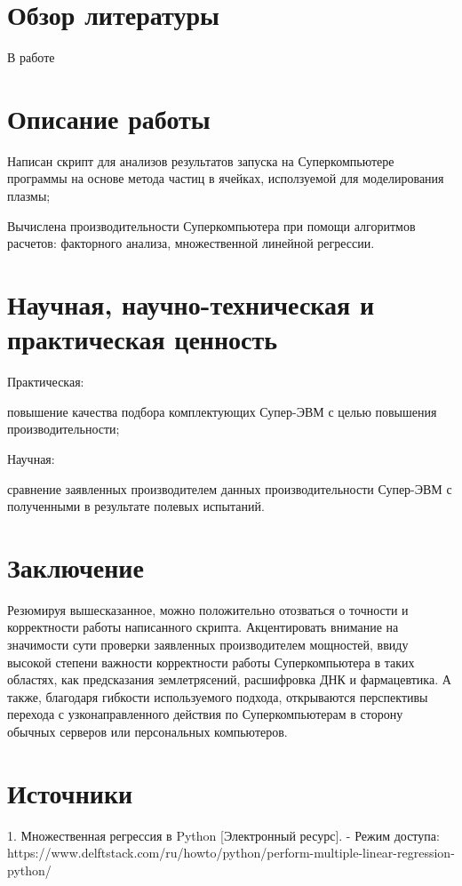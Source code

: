 \documentclass{article}
\begin{document}
\section{Обзор литературы}
В работе \cite{greenwade93}

\section{Описание работы}
Написан скрипт для анализов результатов запуска на Суперкомпьютере программы на основе метода частиц в ячейках, исползуемой для моделирования плазмы;

Вычислена производительности Суперкомпьютера при помощи алгоритмов расчетов: факторного анализа, множественной линейной регрессии.

\section{Научная, научно-техническая и практическая ценность}
Практическая:

повышение качества подбора комплектующих Супер-ЭВМ с целью повышения производительности;

Научная:

сравнение заявленных производителем данных производительности Супер-ЭВМ с полученными в результате полевых испытаний.

\section{Заключение}
Резюмируя вышесказанное, можно положительно отозваться о точности и корректности работы написанного скрипта. Акцентировать внимание на значимости сути проверки заявленных производителем мощностей, ввиду высокой степени важности корректности работы Суперкомпьютера в таких областях, как предсказания землетрясений, расшифровка ДНК и фармацевтика. А также, благодаря гибкости используемого подхода, открываются перспективы перехода с узконаправленного действия по Суперкомпьютерам в сторону обычных серверов или персональных компьютеров.




\section{Источники}
1. Множественная регрессия в Python [Электронный ресурс].
   - Режим доступа: https://www.delftstack.com/ru/howto/python/perform-multiple-linear-regression-python/
\end{document}
